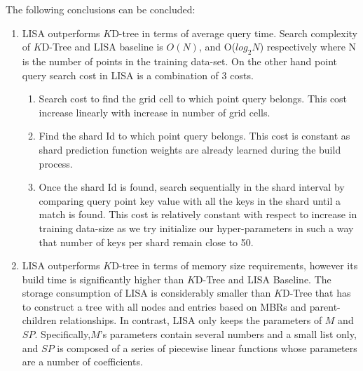 \begin{mscconclusion}
The following conclusions can be concluded:

	\begin{enumerate}
    \item LISA outperforms $K$D-tree in terms of average query time. Search complexity of $K$D-Tree and LISA baseline is $O(N)$, and O($log_{2}N$) respectively where N is the number of points in the training data-set. On the other hand point query search cost in LISA is a combination of 3 costs.
    \begin{enumerate}
    \item Search cost to find the grid cell to which point query belongs. This cost increase linearly with increase in number of grid cells. 
    
    \item Find the shard Id to which point query belongs. This cost is constant as shard prediction function weights are already learned during the build process. 
    
    \item Once the shard Id is found, search sequentially in the shard interval by comparing query point key value with all the keys in the shard until a match is found. This cost is relatively constant with respect to increase in training data-size as we try initialize our hyper-parameters in such a way that number of keys per shard remain close to 50. 
\end{enumerate}
    
    \item LISA outperforms $K$D-tree in terms of memory size requirements, however its build time is significantly higher than $K$D-Tree and LISA Baseline. The storage consumption of LISA is considerably smaller than $K$D-Tree that has to construct a tree with all nodes and entries based on MBRs and parent-children relationships. In contrast, LISA only keeps the parameters of $M$ and $SP$. Specifically,$M$’s parameters contain several numbers and a small list only, and $SP$ is composed of a series of piecewise linear functions whose parameters are a number of coefficients.
\end{enumerate}

\end{mscconclusion}

